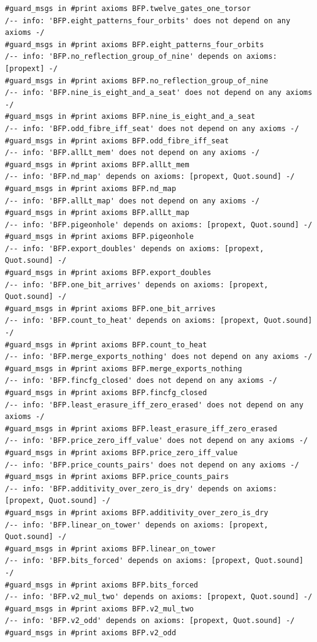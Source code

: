 \documentclass[10pt,twocolumn]{article}
\begin{document}
\begin{Verbatim}
#guard_msgs in #print axioms BFP.twelve_gates_one_torsor
/-- info: 'BFP.eight_patterns_four_orbits' does not depend on any axioms -/
#guard_msgs in #print axioms BFP.eight_patterns_four_orbits
/-- info: 'BFP.no_reflection_group_of_nine' depends on axioms: [propext] -/
#guard_msgs in #print axioms BFP.no_reflection_group_of_nine
/-- info: 'BFP.nine_is_eight_and_a_seat' does not depend on any axioms -/
#guard_msgs in #print axioms BFP.nine_is_eight_and_a_seat
/-- info: 'BFP.odd_fibre_iff_seat' does not depend on any axioms -/
#guard_msgs in #print axioms BFP.odd_fibre_iff_seat
/-- info: 'BFP.allLt_mem' does not depend on any axioms -/
#guard_msgs in #print axioms BFP.allLt_mem
/-- info: 'BFP.nd_map' depends on axioms: [propext, Quot.sound] -/
#guard_msgs in #print axioms BFP.nd_map
/-- info: 'BFP.allLt_map' does not depend on any axioms -/
#guard_msgs in #print axioms BFP.allLt_map
/-- info: 'BFP.pigeonhole' depends on axioms: [propext, Quot.sound] -/
#guard_msgs in #print axioms BFP.pigeonhole
/-- info: 'BFP.export_doubles' depends on axioms: [propext, Quot.sound] -/
#guard_msgs in #print axioms BFP.export_doubles
/-- info: 'BFP.one_bit_arrives' depends on axioms: [propext, Quot.sound] -/
#guard_msgs in #print axioms BFP.one_bit_arrives
/-- info: 'BFP.count_to_heat' depends on axioms: [propext, Quot.sound] -/
#guard_msgs in #print axioms BFP.count_to_heat
/-- info: 'BFP.merge_exports_nothing' does not depend on any axioms -/
#guard_msgs in #print axioms BFP.merge_exports_nothing
/-- info: 'BFP.fincfg_closed' does not depend on any axioms -/
#guard_msgs in #print axioms BFP.fincfg_closed
/-- info: 'BFP.least_erasure_iff_zero_erased' does not depend on any axioms -/
#guard_msgs in #print axioms BFP.least_erasure_iff_zero_erased
/-- info: 'BFP.price_zero_iff_value' does not depend on any axioms -/
#guard_msgs in #print axioms BFP.price_zero_iff_value
/-- info: 'BFP.price_counts_pairs' does not depend on any axioms -/
#guard_msgs in #print axioms BFP.price_counts_pairs
/-- info: 'BFP.additivity_over_zero_is_dry' depends on axioms: [propext, Quot.sound] -/
#guard_msgs in #print axioms BFP.additivity_over_zero_is_dry
/-- info: 'BFP.linear_on_tower' depends on axioms: [propext, Quot.sound] -/
#guard_msgs in #print axioms BFP.linear_on_tower
/-- info: 'BFP.bits_forced' depends on axioms: [propext, Quot.sound] -/
#guard_msgs in #print axioms BFP.bits_forced
/-- info: 'BFP.v2_mul_two' depends on axioms: [propext, Quot.sound] -/
#guard_msgs in #print axioms BFP.v2_mul_two
/-- info: 'BFP.v2_odd' depends on axioms: [propext, Quot.sound] -/
#guard_msgs in #print axioms BFP.v2_odd

\end{Verbatim}
\end{document}

